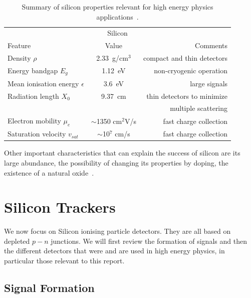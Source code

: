 \begin{table}[htbp]
   \centering
   \begin{tabular}{@{} lcr @{}} %
      \toprule
      \multicolumn{3}{c}{Silicon} \\
      \cmidrule(r){1-3} %
      Feature    & Value & Comments \\
      \midrule
      Density  $\rho$    & 2.33~g/cm${^3}$ & compact and thin detectors  \\
      Energy bandgap $E_g$ & 1.12~eV & non-cryogenic operation \\
      Mean ionisation energy $\epsilon$ & 3.6~eV & large signals\\
      Radiation length $X_0$      &  9.37~cm & thin detectors to minimize  \\
                                       &                 & multiple scattering \\
      Electron mobility  $\mu_e$     & $\sim$1350 cm$^2$V/s  & fast charge collection \\
      Saturation velocity $v_{sat}$ & $\sim$10$^{7}$ cm/s & fast charge collection \\
      \bottomrule
   \end{tabular}
   \caption{\label{tab:SiProp}Summary of silicon properties relevant for high energy physics applications~\cite{Lutz:411172}.}
   \label{tab:SiProperties}
\end{table}

Other important characteristics that can explain the success of silicon are its large abundance, 
the possibility of changing its properties by doping, the existence of a natural oxide~\cite{Hartmann2012}.

\section{Silicon Trackers}
\label{sec:Trackers}
We now focus on Silicon ionising particle detectors. They are all based on depleted $p-n$ junctions.  
We will first review the formation of signals and then the different detectors that were and are used 
in high energy physics, in particular those relevant to this report.

\subsection{Signal Formation}
\label{sec:SigForm}


